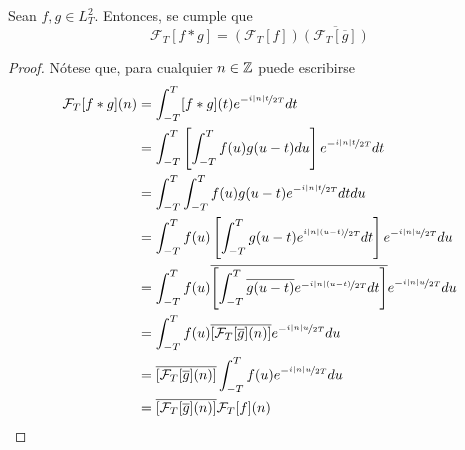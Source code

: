 %

\begin{teorema}
Sean $f, g \in L^{2}_T$. Entonces, se cumple que
\begin{equation}
\mathcal{F}_T[f \ast g] = \left( \mathcal{F}_T[f] \right) \overline{\left( \mathcal{F}_T[\overline{g}] \right)}
\end{equation}
\end{teorema}

\begin{proof}
Nótese que, para cualquier $n \in \mathbb{Z}$ puede escribirse
\begin{align*}
\mathcal{F}_T[f \ast g] (n)
&= \int_{- T }^{ T } [f\ast g](t) e^{-\nicefrac{ i \left| n \right| t}{2T}} dt \\
&= \int_{- T }^{ T } \left[ \int_{- T }^{ T } f(u) g(u-t) du \right] e^{-\nicefrac{ i \left| n \right| t}{2T}} dt \\
&= \int_{- T }^{ T } \int_{- T }^{ T } f(u) g(u-t) e^{-\nicefrac{ i \left| n \right| t}{2T}} dt du \\
&= \int_{- T }^{ T } f(u) \left[ \int_{- T }^{ T } g(u-t) e^{\nicefrac{ i \left| n \right| (u-t)}{2T}} dt \right] e^{-\nicefrac{ i \left| n \right| u}{2T}} du \\
&= \int_{- T }^{ T } f(u) \overline{\left[ \int_{- T }^{ T } \overline{g(u-t)} e^{-\nicefrac{ i \left| n \right| (u-t)}{2T}} dt \right]} e^{-\nicefrac{ i \left| n \right| u}{2T}} du \\
&= \int_{- T }^{ T } f(u) \overline{\left[ \mathcal{F}_T[\overline{g}](n) \right]} e^{-\nicefrac{ i \left| n \right| u}{2T}} du \\
&= \overline{\left[ \mathcal{F}_T[\overline{g}](n) \right]} \int_{- T }^{ T } f(u) e^{-\nicefrac{ i \left| n \right| u}{2T}} du \\
&= \overline{\left[ \mathcal{F}_T[\overline{g}](n) \right]} \mathcal{F}_T[f] (n)
\end{align*}
\end{proof}

